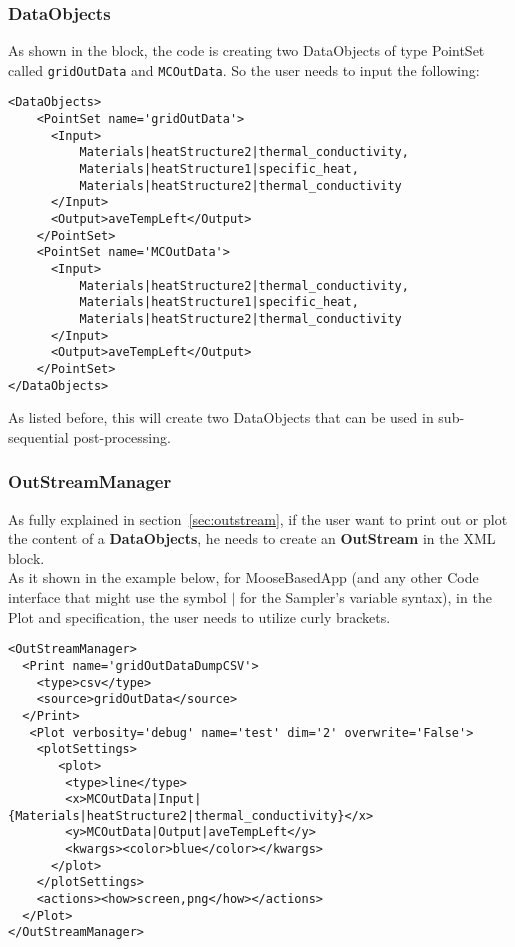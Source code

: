 \subsubsection{DataObjects}
As shown in the  block, the code is creating two DataObjects of type PointSet
called \texttt{gridOutData} and \texttt{MCOutData}.
%
So the user needs to input the following:
\begin{lstlisting}[style=XML]
<DataObjects>
    <PointSet name='gridOutData'>
      <Input>
          Materials|heatStructure2|thermal_conductivity,
          Materials|heatStructure1|specific_heat,
          Materials|heatStructure2|thermal_conductivity
      </Input>
      <Output>aveTempLeft</Output>
    </PointSet>
    <PointSet name='MCOutData'>
      <Input>
          Materials|heatStructure2|thermal_conductivity,
          Materials|heatStructure1|specific_heat,
          Materials|heatStructure2|thermal_conductivity
      </Input>
      <Output>aveTempLeft</Output>
    </PointSet>
</DataObjects>
\end{lstlisting}
As listed before, this will create two DataObjects that can be used in sub-sequential post-processing.
\subsubsection{OutStreamManager}
As fully explained in section~\ref{sec:outstream}, if the user want to print out or plot the content of a \textbf{DataObjects},
he needs to create an \textbf{OutStream} in the  XML block.
\\As it shown in the example below, for MooseBasedApp (and any other Code interface that might use the symbol $|$ 
for the Sampler's variable syntax), in the Plot  and  specification, the user needs to
utilize curly brackets.
\begin{lstlisting}[style=XML]
<OutStreamManager>
  <Print name='gridOutDataDumpCSV'>
    <type>csv</type>
    <source>gridOutData</source>
  </Print>
   <Plot verbosity='debug' name='test' dim='2' overwrite='False'>
    <plotSettings>
       <plot>
        <type>line</type>
        <x>MCOutData|Input|{Materials|heatStructure2|thermal_conductivity}</x>
        <y>MCOutData|Output|aveTempLeft</y>
        <kwargs><color>blue</color></kwargs>
      </plot>
    </plotSettings>
    <actions><how>screen,png</how></actions>
  </Plot>
</OutStreamManager>
\end{lstlisting}

